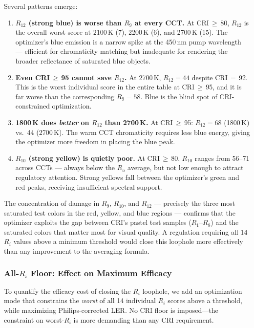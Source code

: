 \documentclass[11pt]{article}
\begin{document}
\noindent Several patterns emerge:

\begin{enumerate}
\item \textbf{$R_{12}$ (strong blue) is worse than $R_9$ at every CCT.}
  At CRI\,$\geq$\,80, $R_{12}$ is the overall worst score at 2100\,K
  (7), 2200\,K (6), and 2700\,K (15).  The optimizer's blue emission is a
  narrow spike at the 450\,nm pump wavelength --- efficient for
  chromaticity matching but inadequate for rendering the broader
  reflectance of saturated blue objects.

\item \textbf{Even CRI\,$\geq$\,95 cannot save $R_{12}$.}  At 2700\,K,
  $R_{12} = 44$ despite CRI\,$=$\,92.  This is the worst individual
  score in the entire table at CRI\,$\geq$\,95, and it is far worse
  than the corresponding $R_9 = 58$.  Blue is the blind spot
  of CRI-constrained optimization.

\item \textbf{1800\,K does \emph{better} on $R_{12}$ than 2700\,K.}
  At CRI\,$\geq$\,95: $R_{12} = 68$ (1800\,K) vs.\ 44 (2700\,K).
  The warm CCT chromaticity requires less blue energy, giving the
  optimizer more freedom in placing the blue peak.

\item \textbf{$R_{10}$ (strong yellow) is quietly poor.}  At
  CRI\,$\geq$\,80, $R_{10}$ ranges from 56--71 across CCTs --- always
  below the $R_a$ average, but not low enough to attract regulatory
  attention.  Strong yellows fall between the optimizer's green and
  red peaks, receiving insufficient spectral support.
\end{enumerate}

The concentration of damage in $R_9$, $R_{10}$, and $R_{12}$ ---
precisely the three most saturated test colors in the red, yellow, and
blue regions --- confirms that the optimizer exploits the gap between
CRI's pastel test samples ($R_1$--$R_8$) and the saturated colors
that matter most for visual quality.  A regulation requiring all 14
$R_i$ values above a minimum threshold would close this loophole more
effectively than any improvement to the averaging formula.

\subsubsection{All-$R_i$ Floor: Effect on Maximum Efficacy}
\label{sec:allri}

To quantify the efficacy cost of closing the $R_i$ loophole, we add an
optimization mode that constrains the \emph{worst} of all 14 individual
$R_i$ scores above a threshold, while maximizing Philips-corrected LER.
No CRI floor is imposed---the constraint on worst-$R_i$ is more
demanding than any CRI requirement.
\end{document}
